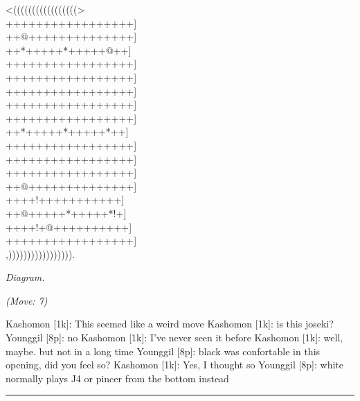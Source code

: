 \documentclass[letterpaper,12pt]{memoir}
\newcounter{GoFigure}[part]
\newcommand{\gofigure}{%
 \stepcounter{GoFigure}
 \centerline{\textit{Diagram.\thinspace\arabic{GoFigure}}}
}
\newcommand{\subtext}[1]{\centerline{\textit{#1}}}
\begin{document}
\begin{minipage}[t]{240pt}
{\gnos
<(((((((((((((((((>\\
+++++++++++++++++]\\
++@++++++++++++++]\\
++*+++++*+++++@++]\\
+++++++++++++++++]\\
+++++++++++++++++]\\
+++++++++++++++++]\\
+++++++++++++++++]\\
+++++++++++++++++]\\
++*+++++*+++++*++]\\
+++++++++++++++++]\\
+++++++++++++++++]\\
+++++++++++++++++]\\
++@++++++++++++++]\\
++++!+++++++++++]\\
++@+++++*+++++*!+]\\
++++!+@++++++++++]\\
+++++++++++++++++]\\
,))))))))))))))))).\\
}
\gofigure

\subtext{(Move: 7)}
\end{minipage}
\begin{minipage}[t]{268.19999999999993pt}
\setlength{\parskip}{0.5em}
Kashomon [1k]: This seemed like a weird move
Kashomon [1k]: is this joseki?
Younggil [8p]: no
Kashomon [1k]: I've never seen it before
Kashomon [1k]: well, maybe. but not in a long time
Younggil [8p]: black was confortable in this opening, did you feel so?
Kashomon [1k]: Yes, I thought so
Younggil [8p]: white normally plays J4 or pincer from the bottom instead


\end{minipage}
\vfill

\rule{\textwidth}{0.5pt}
\end{document}
